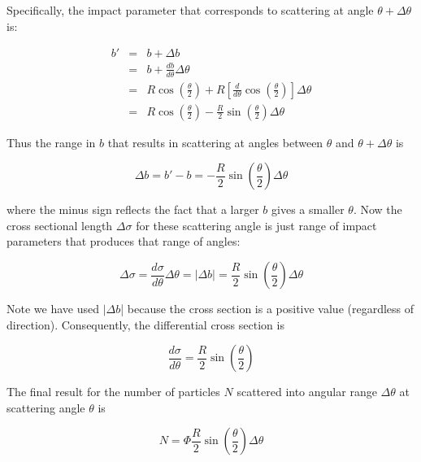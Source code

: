 \documentclass[11pt]{article}
\begin{document}
\vspace{3mm}

\noindent Specifically, 
the impact
parameter that corresponds to scattering at angle $\theta+\Delta \theta$ is:

\begin{eqnarray}
  b' &=& b+\Delta b \\
     &=& b+\frac{db}{d\theta}\Delta \theta \\
     &=& R\cos\left( \frac{\theta}{2} \right) + R\left[ \frac{d}{d\theta}\cos\left(
      \frac{\theta}{2} \right) \right]\Delta \theta \\
     &=& R\cos\left( \frac{\theta}{2} \right)-\frac{R}{2}\sin\left(
         \frac{\theta}{2} \right) \Delta \theta
\end{eqnarray}

\noindent Thus the range in $b$ that results in scattering at angles between
$\theta$ and $\theta+\Delta\theta$ is

\begin{equation}
\Delta b = b'-b = -\frac{R}{2}\sin\left( \frac{\theta}{2} \right)\Delta \theta
\end{equation}

\noindent where the minus sign reflects the fact that a larger $b$ gives a smaller
$\theta$. Now the cross
sectional length $\Delta \sigma$ for these scattering angle is just range of impact parameters that produces that range of angles:

\begin{equation}
  \Delta \sigma = \frac{d\sigma}{d\theta}\Delta\theta=|\Delta b| = \frac{R}{2}
  \sin\left( \frac{\theta}{2} \right) \Delta\theta
\end{equation}

\noindent Note we have used $|\Delta b$| because the cross section is a positive value (regardless of direction). Consequently, the differential cross section is

\begin{equation}
\frac{d\sigma}{d\theta} = \frac{R}{2}\sin\left( \frac{\theta}{2} \right)
\end{equation}

\noindent The final result for the number of particles $N$ scattered into
angular range $\Delta \theta$ at scattering angle $\theta$ is

\begin{equation}
N = \Phi\frac{R}{2}\sin\left( \frac{\theta}{2} \right) \Delta \theta
\end{equation}
\end{document}
